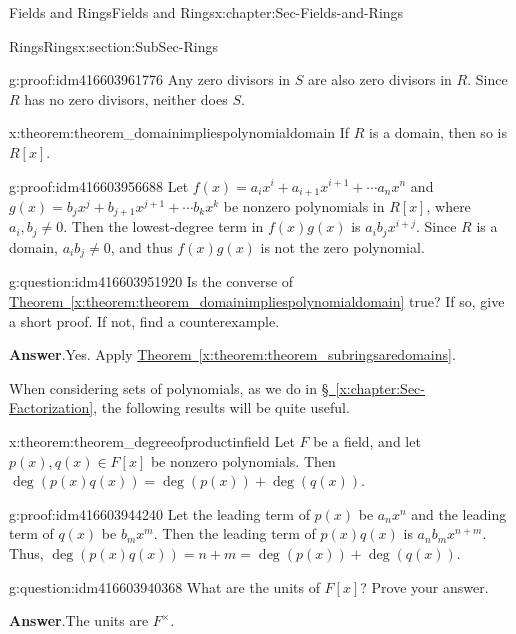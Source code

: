 \documentclass[oneside,10pt,]{book}
\numberwithin{equation}{section}
\begin{document}
\begin{chapterptx}{Fields and Rings}{}{Fields and Rings}{}{}{x:chapter:Sec-Fields-and-Rings}
\begin{sectionptx}{Rings}{}{Rings}{}{}{x:section:SubSec-Rings}
\begin{proofptx}{}{g:proof:idm416603961776}
Any zero divisors in \(S\) are also zero divisors in \(R\). Since \(R\) has no zero divisors, neither does \(S\).%
\end{proofptx}
\begin{theorem}{}{}{x:theorem:theorem_domainimpliespolynomialdomain}%
If \(R\) is a domain, then so is \(R[x]\).%
\end{theorem}
\begin{proofptx}{}{g:proof:idm416603956688}
Let \(f(x) = a_i x^i + a_{i+1} x^{i+1} + \cdots a_n x^n\) and \(g(x) = b_j x^j + b_{j+1} x^{j+1} + \cdots b_k x^k\) be nonzero polynomials in \(R[x]\), where \(a_i, b_j \ne 0\). Then the lowest-degree term in \(f(x) g(x)\) is \(a_i b_j x^{i+j}\). Since \(R\) is a domain, \(a_i b_j\ne 0\), and thus \(f(x)g(x)\) is not the zero polynomial.%
\end{proofptx}
\begin{question}{}{g:question:idm416603951920}%
Is the converse of \hyperref[x:theorem:theorem_domainimpliespolynomialdomain]{Theorem~\ref{x:theorem:theorem_domainimpliespolynomialdomain}} true? If so, give a short proof. If not, find a counterexample.%
\par\smallskip%
\noindent\textbf{Answer}.\hypertarget{g:answer:idm416603950032}{}\quad{}Yes. Apply \hyperref[x:theorem:theorem_subringsaredomains]{Theorem~\ref{x:theorem:theorem_subringsaredomains}}.%
\end{question}
When considering sets of polynomials, as we do in \hyperref[x:chapter:Sec-Factorization]{§~\ref{x:chapter:Sec-Factorization}}, the following results will be quite useful.%
\begin{theorem}{}{}{x:theorem:theorem_degreeofproductinfield}%
Let \(F\) be a field, and let \(p(x),q(x)\in F[x]\) be nonzero polynomials. Then \(\deg(p(x) q(x)) = \deg(p(x)) + \deg(q(x))\).%
\end{theorem}
\begin{proofptx}{}{g:proof:idm416603944240}
Let the leading term of \(p(x)\) be \(a_n x^n\) and the leading term of \(q(x)\) be \(b_m x^m\). Then the leading term of \(p(x) q(x)\) is \(a_n b_m x^{n+m}\). Thus, \(\deg(p(x) q(x)) = n+m = \deg(p(x)) + \deg(q(x))\).%
\end{proofptx}
\begin{question}{}{g:question:idm416603940368}%
What are the units of \(F[x]\)? Prove your answer.%
\par\smallskip%
\noindent\textbf{Answer}.\hypertarget{g:answer:idm416603938784}{}\quad{}The units are \(F^\times\).%
\par

\end{question}
\end{sectionptx}
\end{chapterptx}
\end{document}
